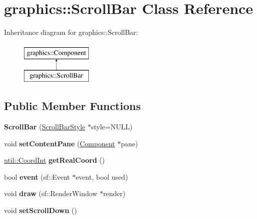 \hypertarget{classgraphics_1_1_scroll_bar}{\section{graphics\-:\-:Scroll\-Bar Class Reference}
\label{classgraphics_1_1_scroll_bar}
}
Inheritance diagram for graphics\-:\-:Scroll\-Bar\-:\begin{figure}[H]
\begin{center}
\leavevmode
\includegraphics[height=2.000000cm]{classgraphics_1_1_scroll_bar}
\end{center}
\end{figure}
\subsection*{Public Member Functions}
\begin{DoxyCompactItemize}
\item 
\hypertarget{classgraphics_1_1_scroll_bar_a2a2b3505bfeba66490ec6af8064dcb3f}{{\bfseries Scroll\-Bar} (\hyperlink{classgraphics_1_1_scroll_bar_style}{Scroll\-Bar\-Style} $\ast$style=N\-U\-L\-L)}\label{classgraphics_1_1_scroll_bar_a2a2b3505bfeba66490ec6af8064dcb3f}

\item 
\hypertarget{classgraphics_1_1_scroll_bar_a6c80756fcbebafb14ac49b053c786e00}{void {\bfseries set\-Content\-Pane} (\hyperlink{classgraphics_1_1_component}{Component} $\ast$pane)}\label{classgraphics_1_1_scroll_bar_a6c80756fcbebafb14ac49b053c786e00}

\item 
\hypertarget{classgraphics_1_1_scroll_bar_abd62ea4cf556922cc56f7eb92fde16c9}{\hyperlink{classutil_1_1_coordinates}{util\-::\-Coord\-Int} {\bfseries get\-Real\-Coord} ()}\label{classgraphics_1_1_scroll_bar_abd62ea4cf556922cc56f7eb92fde16c9}

\item 
\hypertarget{classgraphics_1_1_scroll_bar_a7a7575dd548ecd075423682ba32edf3d}{bool {\bfseries event} (sf\-::\-Event $\ast$event, bool used)}\label{classgraphics_1_1_scroll_bar_a7a7575dd548ecd075423682ba32edf3d}

\item 
\hypertarget{classgraphics_1_1_scroll_bar_a835c39a9015e73b0c94b5c4a036114b7}{void {\bfseries draw} (sf\-::\-Render\-Window $\ast$render)}\label{classgraphics_1_1_scroll_bar_a835c39a9015e73b0c94b5c4a036114b7}

\item 
\hypertarget{classgraphics_1_1_scroll_bar_ada29f32c79bc0498518f8d2e6d3efdca}{void {\bfseries set\-Scroll\-Down} ()}\label{classgraphics_1_1_scroll_bar_ada29f32c79bc0498518f8d2e6d3efdca}

\end{DoxyCompactItemize}
